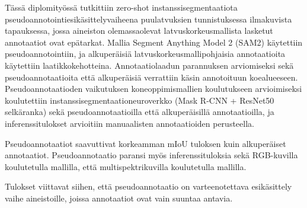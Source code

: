 \documentclass[english, 12pt, a4paper, sci, utf8, a-2b, online]{aaltothesis}
\begin{document}

\newpage
\date{30.9.2025}
\begin{abstractpage}[finnish]

    Tässä diplomityössä tutkittiin zero-shot instanssisegmentaatiota pseudoannotointiesikäsittelyvaiheena puulatvuksien tunnistuksessa ilmakuvista tapauksessa, jossa aineiston olemassaolevat latvuskorkeusmallista lasketut annotaatiot ovat epätarkat. Mallia Segment Anything Model 2 (SAM2) käytettiin pseudoannotointiin, ja alkuperäisiä latvuskorkeusmallipohjaisia annotaatioita käytettiin laatikkokehotteina. Annotaatiolaadun parannuksen arviomiseksi sekä pseudoannotaatioita että alkuperäisiä verrattiin käsin annotoituun koealueeseen. Pseudoannotaatioden vaikutuksen koneoppimismallien koulutukseen arvioimiseksi koulutettiin instanssisegmentaationeuroverkko (Mask R-CNN + ResNet50 selkäranka) sekä pseudoannotaatioilla että alkuperäisillä annotaatioilla, ja inferenssitulokset arvioitiin manuaalisten annotaatioiden perusteella.

    Pseudoannotaatiot saavuttivat korkeamman mIoU tuloksen kuin alkuperäiset annotaatiot. Pseudoannotaatio paransi myös inferenssituloksia sekä RGB-kuvilla koulutetulla mallilla, että multispektrikuvilla koulutetulla mallilla.

    Tulokset viittavat siihen, että pseudoannotaatio on varteenotettava esikäsittely vaihe aineistoille, joissa annotaatiot ovat vain suuntaa antavia.

\end{abstractpage}
\end{document}
